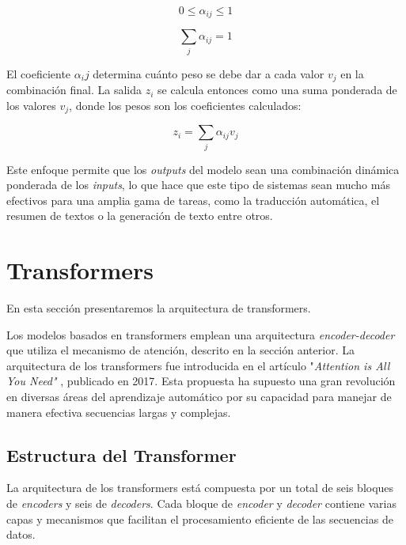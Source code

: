 \documentclass[11pt,spanish,listoffigures,listoftables]{tfgetsinf}
\begin{document}
\begin{equation}
0 \le \alpha_{ij} \le 1
\end{equation}

\begin{equation}
\sum_j\alpha_{ij} = 1
\end{equation}

El coeficiente $\alpha_ij$ determina cuánto peso se debe dar a cada valor $v_j$ en la combinación final. La salida $z_i$ se calcula entonces como una suma ponderada de los valores $v_j$, donde los pesos son los coeficientes calculados:

\begin{equation}
z_i = \sum_j\alpha_{ij}v_j
\end{equation}

Este enfoque permite que los \textit{outputs} del modelo sean una combinación dinámica ponderada de los \textit{inputs}, lo que hace que este tipo de sistemas sean mucho más efectivos para una amplia gama de tareas, como la traducción automática, el resumen de textos o la generación de texto entre otros.

\section{Transformers} \label{transformers}

En esta sección presentaremos la arquitectura de transformers.

Los modelos basados en transformers emplean una arquitectura \textit{encoder-decoder} que utiliza el mecanismo de atención, descrito en la sección anterior. La arquitectura de los transformers fue introducida en el artículo "\textit{Attention is All You Need"} \cite{vaswani2023attentionneed}, publicado en 2017. Esta propuesta ha supuesto una gran revolución en diversas áreas del aprendizaje automático por su capacidad para manejar de manera efectiva secuencias largas y complejas.

\subsection{Estructura del Transformer}

La arquitectura de los transformers está compuesta por un total de seis bloques de \textit{encoders} y seis de \textit{decoders}. Cada bloque de \textit{encoder} y \textit{decoder} contiene varias capas y mecanismos que facilitan el procesamiento eficiente de las secuencias de datos.
\end{document}
